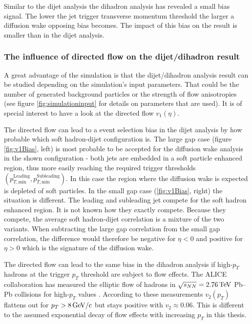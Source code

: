 \documentclass[
  a4paper,
  12pt,
  oneside,
  parskip=half,
  listof=totoc,
  bibliography=totoc,
  DIV=12,
  numbers=noenddot,
  BA.tex
  ]{subfiles}
\begin{document}
Similar to the dijet analysis the dihadron analysis has revealed a small bias signal. The lower the jet trigger transverse momentum threshold the larger a diffusion wake opposing bias becomes. The impact of this bias on the result is smaller than in the dijet analysis.


\subsubsection{The influence of directed flow on the dijet/dihadron result}

A great advantage of the simulation is that the dijet/dihadron analysis result can be studied depending on the simulation's input parameters. That could be the number of generated background particles or the strength of flow anisotropies (see figure \ref{fig:simulationinput} for details on parameters that are used). It is of special interest to have a look at the directed flow $v_1(\eta)$.

The directed flow can lead to a event selection bias in the dijet analysis by how probable which soft hadron-dijet configuration is. The large gap case (figure \ref{fig:v1Bias}, left) is most probable to be accepted for the diffusion wake analysis in the shown configuration - both jets are embedded in a soft particle enhanced region, thus more easily reaching the required trigger thresholds $(p_{T,\text{min}}^\text{Leading}, p_{T,\text{min}}^\text{Subleading})$. In this case the region where the diffusion wake is expected is depleted of soft particles. In the small gap case (\ref{fig:v1Bias}, right) the situation is different. The leading and subleading jet compete for the soft hadron enhanced region. It is not known how they exactly compete. Because they compete, the average soft hadron-dijet correlation is a mixture of the two variants. When subtracting the large gap correlation from the small gap correlation, the difference would therefore be negative for $\eta < 0$ and positive for $\eta > 0$ which is the signature of the diffusion wake.

The directed flow can lead to the same bias in the dihadron analysis if high-$p_T$ hadrons at the trigger $p_T$ threshold are subject to flow effects. The ALICE collaboration has measured the elliptic flow of hadrons in $\sqrt{s_{NN}} = 2.76 \bunit{TeV}$ Pb--Pb collisions for high-$p_T$ values \cite{dobrin_elliptic_2011}. According to these measurements $v_2(p_T)$ flattens out for $p_T > 8 \bunit{GeV/c}$ but stays positive with $v_2 \approx 0.06$. This is different to the assumed exponential decay of flow effects with increasing $p_T$ in this thesis. 
\end{document}
